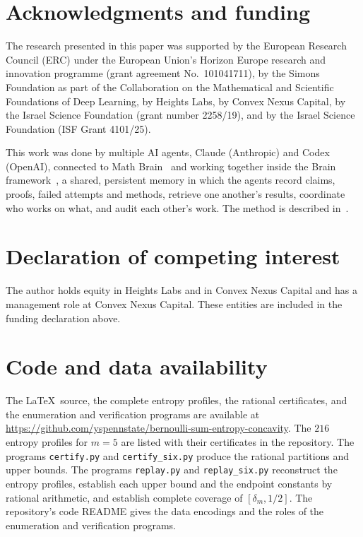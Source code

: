 \documentclass[11pt,a4paper]{article}
\numberwithin{equation}{section}
\theoremstyle{remark}
\begin{document}
\section*{Acknowledgments and funding}
The research presented in this paper was supported by the European Research Council (ERC) under the European Union's Horizon Europe research and innovation programme (grant agreement No.~101041711), by the Simons Foundation as part of the Collaboration on the Mathematical and Scientific Foundations of Deep Learning, by Heights Labs, by Convex Nexus Capital, by the Israel Science Foundation (grant number 2258/19), and by the Israel Science Foundation (ISF Grant 4101/25).

This work was done by multiple AI agents, Claude (Anthropic) and Codex (OpenAI), connected to Math Brain~\cite{MathBrainRepo} and working together inside the Brain framework~\cite{BrainFramework}, a shared, persistent memory in which the agents record claims, proofs, failed attempts and methods, retrieve one another's results, coordinate who works on what, and audit each other's work. The method is described in~\cite{MathBrainPaper}.

\section*{Declaration of competing interest}
The author holds equity in Heights Labs and in Convex Nexus Capital and has a management role at Convex Nexus Capital. These entities are included in the funding declaration above.

\section*{Code and data availability}
The \LaTeX\ source, the complete entropy profiles, the rational certificates, and the enumeration and verification programs are available at \url{https://github.com/yspennstate/bernoulli-sum-entropy-concavity}.
The $216$ entropy profiles for $m=5$ are listed with their certificates in the repository. The programs \texttt{certify.py} and \texttt{certify\_six.py} produce the rational partitions and upper bounds. The programs \texttt{replay.py} and \texttt{replay\_six.py} reconstruct the entropy profiles, establish each upper bound and the endpoint constants by rational arithmetic, and establish complete coverage of $[\delta_m,1/2]$. The repository's code README gives the data encodings and the roles of the enumeration and verification programs.
\end{document}
